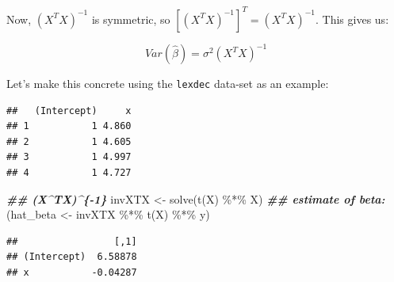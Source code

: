 \documentclass[
  12pt,
]{krantz}
\newenvironment{Shaded}{\begin{snugshade}}{\end{snugshade}}
\newcommand{\AttributeTok}[1]{\textcolor[rgb]{0.77,0.63,0.00}{#1}}
\newcommand{\DecValTok}[1]{\textcolor[rgb]{0.00,0.00,0.81}{#1}}
\newcommand{\DocumentationTok}[1]{\textcolor[rgb]{0.56,0.35,0.01}{\textbf{\textit{#1}}}}
\newcommand{\FunctionTok}[1]{\textcolor[rgb]{0.00,0.00,0.00}{#1}}
\newcommand{\NormalTok}[1]{#1}
\newcommand{\OtherTok}[1]{\textcolor[rgb]{0.56,0.35,0.01}{#1}}
\newcommand{\SpecialCharTok}[1]{\textcolor[rgb]{0.00,0.00,0.00}{#1}}
\theoremstyle{definition}
\theoremstyle{definition}
\theoremstyle{definition}
\theoremstyle{definition}
\theoremstyle{remark}
\begin{document}
Now, \((X^TX)^{-1}\) is symmetric, so
\([(X^TX)^{-1}]^T=(X^TX)^{-1}\). This gives us:

\begin{equation}
Var(\hat\beta)= \sigma^2 (X^TX)^{-1} 
\end{equation}

Let's make this concrete using the \texttt{lexdec} data-set as an example:

\begin{Shaded}
\end{Shaded}

\begin{verbatim}
##   (Intercept)     x
## 1           1 4.860
## 2           1 4.605
## 3           1 4.997
## 4           1 4.727
\end{verbatim}

\begin{Shaded}
\begin{Highlighting}[]
\DocumentationTok{\#\# (X\^{}TX)\^{}\{{-}1\}}
\NormalTok{invXTX }\OtherTok{\textless{}{-}} \FunctionTok{solve}\NormalTok{(}\FunctionTok{t}\NormalTok{(X) }\SpecialCharTok{\%*\%}\NormalTok{ X)}
\DocumentationTok{\#\# estimate of beta:}
\NormalTok{(hat\_beta }\OtherTok{\textless{}{-}}\NormalTok{ invXTX }\SpecialCharTok{\%*\%} \FunctionTok{t}\NormalTok{(X) }\SpecialCharTok{\%*\%}\NormalTok{ y)}
\end{Highlighting}
\end{Shaded}

\begin{verbatim}
##                 [,1]
## (Intercept)  6.58878
## x           -0.04287
\end{verbatim}

\begin{Shaded}
\end{Shaded}
\end{document}
